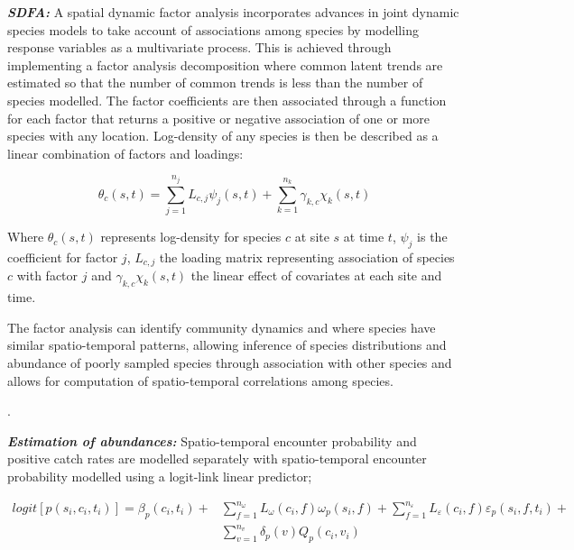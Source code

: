 \documentclass{nature}
\begin{document}
\begin{linenumbers}
\textbf{\textit{SDFA:}} A spatial dynamic factor analysis incorporates advances
in joint dynamic species models\cite{Thorson2017} to take account of
associations among species by modelling response variables as a multivariate
process. This is achieved through implementing a factor analysis decomposition
where common latent trends are estimated so that the number of common trends is
less than the number of species modelled. The factor coefficients are then
associated through a function for each factor that returns a positive or
negative association of one or more species with any location. Log-density of
any species is then be described as a linear combination of factors and
loadings: 

\begin{equation} \theta_{c}(s,t) = \sum_{j=1}^{n_{j}}
	L_{c,j}\psi_{j}(s,t) +\sum_{k=1}^{n_{k}} \gamma_{k,c}\chi_{k}(s,t)
\end{equation} 

Where $\theta_{c}(s,t)$ represents log-density for species $c$
at site $s$ at time $t$, $\psi_{j}$ is the coefficient for factor $j$,
$L_{c,j}$ the loading matrix representing association of species $c$ with
factor $j$ and $\gamma_{k,c}\chi_{k}(s,t)$ the linear effect of covariates at
each site and time\cite{Thorson2016b}. 

The factor analysis can identify community dynamics and where species have
similar spatio-temporal patterns, allowing inference of species distributions
and abundance of poorly sampled species through association with other species
and allows for computation of spatio-temporal correlations among
species\cite{Thorson2016b}.

. 

\textbf{\textit{Estimation of abundances:}} Spatio-temporal encounter
probability and positive catch rates are modelled separately with
spatio-temporal encounter probability modelled using a logit-link linear
predictor;

		\begin{equation}
			\begin{split}
			logit[p(s_{i},c_{i},t_{i})] =	\beta_{p}(c_{i},t_{i}) +
			& \sum\limits_{f=1}^{n_{\omega}} L_{\omega}(c_{i},f)
			\omega_{p}(s_{i},f) + \sum\limits_{f=1}^{n_{\varepsilon}}
			L_{\varepsilon}(c_{i},f) \varepsilon_{p}(s_{i},f,t_{i}) + \\ 
			& \sum\limits_{v=1}^{n_{v}}\delta_{p}(v)Q_{p}(c_{i}, v_{i})
		\end{split}
		\end{equation}


\end{linenumbers}
\end{document}
